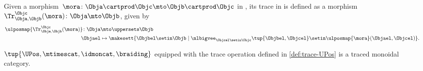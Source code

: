 \begin{definition}
    \label{def:trace-UPos}
    Given a morphism~$\mora\colon \Obja \cartprod \Objc \mto \Objb\cartprod \Objc$ in \UPos, its trace in is defined as a morphism~$\Tr_{\Obja,\Objb}^{\Objc}(\mora)\colon \Obja \mto \Objb$, given by
    \begin{equation}
        \begin{aligned}
            \ulposmap{\Tr_{\Obja,\Objb}^{\Objc}(\mora)}\colon \Obja & \mto \uppersets \Objb \\
            \Objael                                                 & \mapsto \makesett{\Objbel \setin \Objb \mid \nlbigvee_{\Objcel \setin \Objc}\tup{\Objbel, \Objcel}\setin \ulposmap{\mora}(\Objael,\Objcel)}.
        \end{aligned}
    \end{equation}
\end{definition}
\begin{lemma}
    \label{lem:UPos-is-traced}
    $\tup{\UPos,\mtimescat, \idmoncat,\braiding}$ equipped with the trace operation defined in \cref{def:trace-UPos} is a traced monoidal category.
\end{lemma}
